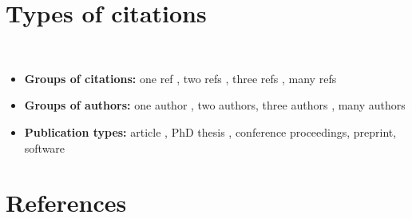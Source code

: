 \documentclass{article}
\begin{document}
\vspace{-2cm}
\maketitle

\section{Types of citations}\

\begin{itemize}
\item
	\textbf{Groups of citations:} one ref {\cite{karelPhD}}, two refs \cite{karelPhD,simplitigs},
  three refs \cite{karelPhD,gnt,simplitigs}, many refs
\item
  \textbf{Groups of authors:} one author \cite{karelPhD}, two authors, three
  authors \cite{simplitigs}, many authors \cite{gnt}
\item
  \textbf{Publication types:} article \cite{gnt}, PhD thesis \cite{karelPhD},
  conference proceedings, preprint, software
\end{itemize}


\section{References}

\printbibliography
\end{document}
